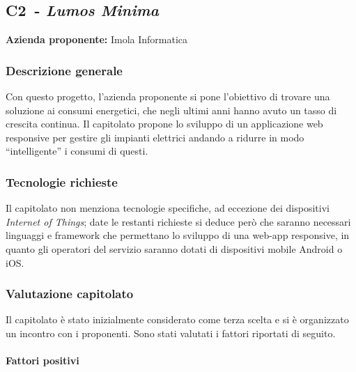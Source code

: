 
\renewcommand{\capName}{\textit{Lumos Minima}} %
\renewcommand{\capCode}{C2} %
\renewcommand{\capLink}{https://www.math.unipd.it/~tullio/IS-1/2022/Progetto/C2.pdf} %
\renewcommand{\capProposer}{ImolaInformatica} %


\subsection{\capCode\ - \capName}
\textbf{Azienda proponente:} Imola Informatica
\subsubsection{Descrizione generale}
Con questo progetto, l'azienda proponente si pone l'obiettivo di trovare una soluzione ai consumi energetici, che negli ultimi anni hanno avuto un tasso di crescita continua. Il capitolato propone lo sviluppo di un applicazione web responsive per gestire gli impianti elettrici andando a ridurre in modo “intelligente” i consumi di questi.
\subsubsection{Tecnologie richieste}
Il capitolato non menziona tecnologie specifiche, ad eccezione dei dispositivi \textit{Internet of Things}; date le restanti richieste si deduce però che saranno necessari linguaggi e framework che permettano lo sviluppo di una web-app responsive, in quanto gli operatori del servizio saranno dotati di dispositivi mobile Android o iOS.

\subsubsection{Valutazione capitolato}
Il capitolato è stato inizialmente considerato come terza scelta e si è organizzato un incontro con i proponenti. Sono stati valutati i fattori riportati di seguito.

\paragraph{Fattori positivi}

